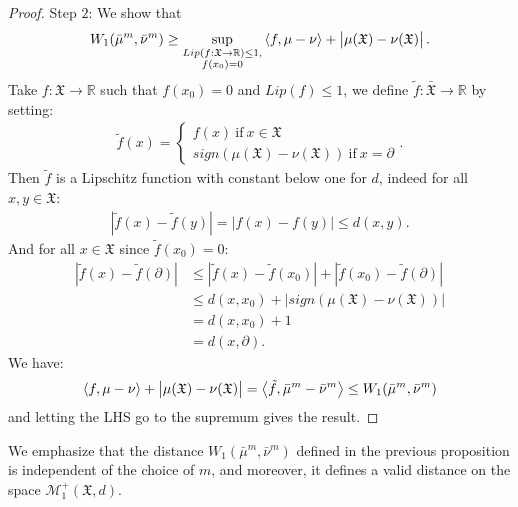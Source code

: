 \documentclass[11pt,a4paper]{article}
\newcommand{\RR}{\mathbb{R}}
\newcommand{\MC}{\mathcal{M}}
\newcommand{\XF}{\mathfrak{X}}
\newcommand{\brac}[1]{\left\langle#1\right\rangle}
\begin{document}
\begin{proof}
    Step $2$: We show that
    \begin{align*}
        W_1(\bar{\mu}^m,\bar{\nu}^m) \geq  \sup\limits_{\substack{Lip(f :\XF \to \RR) \leq 1,\\ f(x_0) = 0}} \brac{f,\mu - \nu} + \left|\vphantom{A^2}\mu(\XF) - \nu(\XF) \right|.
    \end{align*}
    Take $f:\XF \to \RR$ such that $f(x_0) = 0$ and $Lip(f) \leq 1$, we define $\tilde{f}: \bar{\XF}  \to \RR$ by setting:
    \begin{align*}
        \tilde{f}(x) = \left\lbrace
        \begin{aligned}
            f(x)\ \text{if}\ x \in \XF \\
            sign(\mu(\XF) - \nu(\XF))\ \text{if}\ x = \partial
        \end{aligned}
        \right. .
    \end{align*}
    Then $\tilde{f}$ is a Lipschitz function with constant below one for $d$, indeed for all $x,y \in \XF$:
    \begin{align*}
        \left| \tilde{f}(x) - \tilde{f}(y) \right| = \left| f(x) - f(y) \right| \leq d(x,y).
    \end{align*}
    And for all $x \in \XF$ since $\tilde{f}(x_0)= 0$:
    \begin{align*}
        \left| \tilde{f}(x) - \tilde{f}(\partial) \right| &\leq \left| \tilde{f}(x) - \tilde{f}(x_0) \right| + \left| \tilde{f}(x_0) - \tilde{f}(\partial) \right| \\
        &\leq d(x,x_0) + \left|sign(\mu(\XF) - \nu(\XF)) \right| \\
        &= d(x,x_0) + 1 \\
        &= d(x,\partial).
    \end{align*}
    We have:
    \begin{align*}
        \brac{f,\mu - \nu} + \left|\vphantom{A^2}\mu(\XF) - \nu(\XF) \right| = \brac{\tilde{f},\bar{\mu}^m - \bar{\nu}^m} \leq W_1(\bar{\mu}^m ,\bar{\nu}^m)
    \end{align*} 
    and letting the LHS go to the supremum gives the result.
\end{proof}
We emphasize that the distance $W_1(\bar{\mu}^m, \bar{\nu}^m)$ defined in the previous proposition is independent of the choice of $m$, and moreover, it defines a valid distance on the space $\MC^+_{1}(\XF,d)$.
\end{document}
